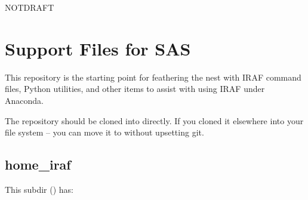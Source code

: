 \documentclass[letter,11pt,oneside]{article}
\def\documentisdraft{NOTDRAFT}
\begin{document}

\setcounter{section}{0}

\ifx\documentisdraft\drafttest
\linenumbers    %
\fi

\section*{Support Files for SAS}

This repository is the starting point for feathering the nest with
IRAF command files, Python utilities, and other items to assist with
using IRAF under Anaconda.

The repository should be cloned into
{\color{verbcolor}{\verb#~/iraf#}} directly. If you cloned it
elsewhere into your file system -- you can move it to
{\color{verbcolor}{\verb#~/iraf#}} without upsetting git.

\subsection{home\_iraf}

This subdir ({\color{verbcolor}{\verb#~/iraf/smtsci/home_bin#}})
has:
\end{document}
